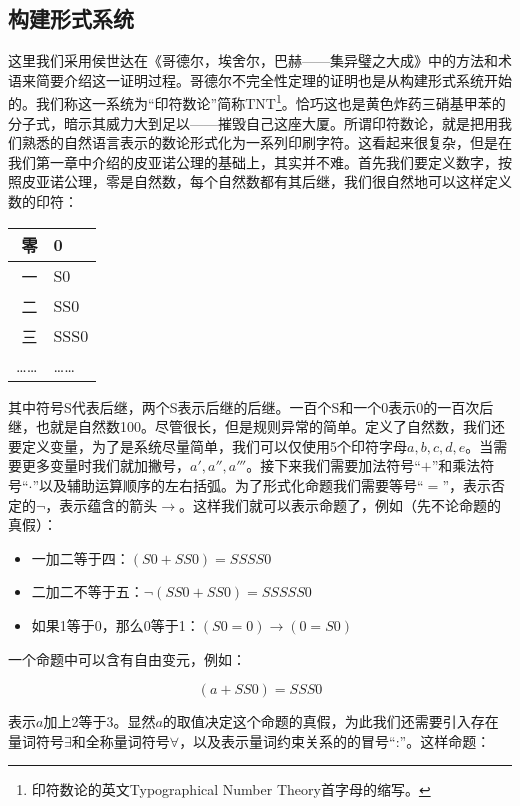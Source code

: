 \documentclass{article}
\begin{document}
\subsection{构建形式系统}
 
这里我们采用侯世达在《哥德尔，埃舍尔，巴赫——集异璧之大成》中的方法和术语来简要介绍这一证明过程。哥德尔不完全性定理的证明也是从构建形式系统开始的。我们称这一系统为“印符数论”简称TNT\footnote{印符数论的英文Typographical Number Theory首字母的缩写。}。恰巧这也是黄色炸药三硝基甲苯的分子式，暗示其威力大到足以——摧毁自己这座大厦。所谓印符数论，就是把用我们熟悉的自然语言表示的数论形式化为一系列印刷字符。这看起来很复杂，但是在我们第一章中介绍的皮亚诺公理的基础上，其实并不难。首先我们要定义数字，按照皮亚诺公理，零是自然数，每个自然数都有其后继，我们很自然地可以这样定义数的印符：

\vspace{5mm}
\begin{tabular}{|r|l|}
零 & 0 \\
\hline
一 & S0 \\
\hline
二 & SS0 \\
\hline
三 & SSS0 \\
\hline
…… & …… \\
\end{tabular}
\vspace{5mm}

其中符号S代表后继，两个S表示后继的后继。一百个S和一个0表示0的一百次后继，也就是自然数100。尽管很长，但是规则异常的简单。定义了自然数，我们还要定义变量，为了是系统尽量简单，我们可以仅使用5个印符字母$a, b, c, d, e$。当需要更多变量时我们就加撇号，$a', a'', a'''$。接下来我们需要加法符号“$+$”和乘法符号“$\cdot$”以及辅助运算顺序的左右括弧。为了形式化命题我们需要等号“$=$”，表示否定的$\lnot$，表示蕴含的箭头$\to$。这样我们就可以表示命题了，例如（先不论命题的真假）：

\begin{itemize}
\item 一加二等于四：$(S0 + SS0) = SSSS0$
\item 二加二不等于五：$\lnot (SS0 + SS0) = SSSSS0$
\item 如果1等于0，那么0等于1：$(S0 = 0) \to (0 = S0)$
\end{itemize}

一个命题中可以含有自由变元，例如：

\[
(a + SS0) = SSS0
\]

表示$a$加上2等于3。显然$a$的取值决定这个命题的真假，为此我们还需要引入存在量词符号$\exists$和全称量词符号$\forall$，以及表示量词约束关系的的冒号“:”。这样命题：
\end{document}
